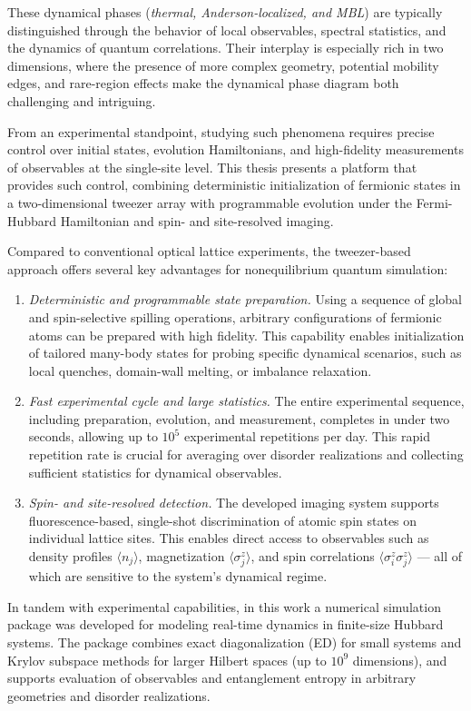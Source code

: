 These dynamical phases (\emph{thermal, Anderson-localized, and MBL}) are typically distinguished through the behavior of local observables, spectral statistics, and the dynamics of quantum correlations. Their interplay is especially rich in two dimensions, where the presence of more complex geometry, potential mobility edges, and rare-region effects make the dynamical phase diagram both challenging and intriguing.

From an experimental standpoint, studying such phenomena requires precise control over initial states, evolution Hamiltonians, and high-fidelity measurements of observables at the single-site level. This thesis presents a platform that provides such control, combining deterministic initialization of fermionic states in a two-dimensional tweezer array with programmable evolution under the Fermi-Hubbard Hamiltonian and spin- and site-resolved imaging.

Compared to conventional optical lattice experiments, the tweezer-based approach offers several key advantages for nonequilibrium quantum simulation:
\begin{enumerate}
	\item \textit{Deterministic and programmable state preparation.} Using a sequence of global and spin-selective spilling operations, arbitrary configurations of fermionic atoms can be prepared with high fidelity. This capability enables initialization of tailored many-body states for probing specific dynamical scenarios, such as local quenches, domain-wall melting, or imbalance relaxation.
	\item \textit{Fast experimental cycle and large statistics.} The entire experimental sequence, including preparation, evolution, and measurement, completes in under two seconds, allowing up to $10^5$ experimental repetitions per day. This rapid repetition rate is crucial for averaging over disorder realizations and collecting sufficient statistics for dynamical observables.
	\item \textit{Spin- and site-resolved detection.} The developed imaging system supports fluorescence-based, single-shot discrimination of atomic spin states on individual lattice sites. This enables direct access to observables such as density profiles $\langle n_j \rangle$, magnetization $\langle \sigma^z_j \rangle$, and spin correlations $\langle \sigma^z_i \sigma^z_j \rangle$ — all of which are sensitive to the system's dynamical regime.
\end{enumerate}

In tandem with experimental capabilities, in this work a numerical simulation package was developed for modeling real-time dynamics in finite-size Hubbard systems. The package combines exact diagonalization (ED) for small systems and Krylov subspace methods for larger Hilbert spaces (up to $10^9$ dimensions), and supports evaluation of observables and entanglement entropy in arbitrary geometries and disorder realizations.

